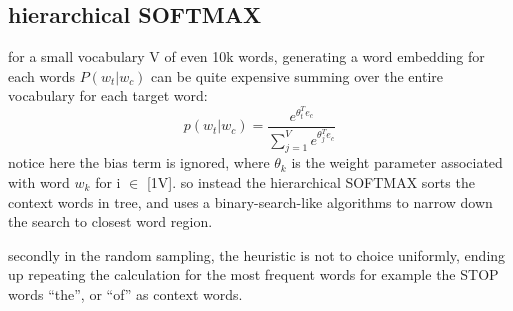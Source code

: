 \documentclass[4apaper,12pt]{book}
\begin{document}
\begin{description}
\begin{description}
\begin{description}
\begin{description}
              \subsection{hierarchical SOFTMAX}
              \begin{description}
              \item for a small vocabulary V of even 10k words, generating a word embedding for each words $P(w_t|w_c)$ can be quite expensive summing over the entire vocabulary for each target word: $$ p(w_t|w_c) = \frac{e^{\theta_t^Te_c}}{\sum_{j=1}^Ve^{\theta_j^Te_c}}$$ notice here the bias term is ignored, where $\theta_k$ is the weight parameter associated with word $w_k$ for i $\in$ [1\text{-}V]. so instead the hierarchical SOFTMAX sorts the context words in tree, and uses a binary-search-like algorithms to narrow down the search to closest word region.
                \item
              \item secondly in the random sampling, the heuristic is not to choice uniformly, ending up repeating the calculation for the most frequent words for example the STOP words ``the'', or ``of'' as context words.
                \end{description}
            \end{description}

\end{description}
\end{description}
\end{description}
\end{document}
